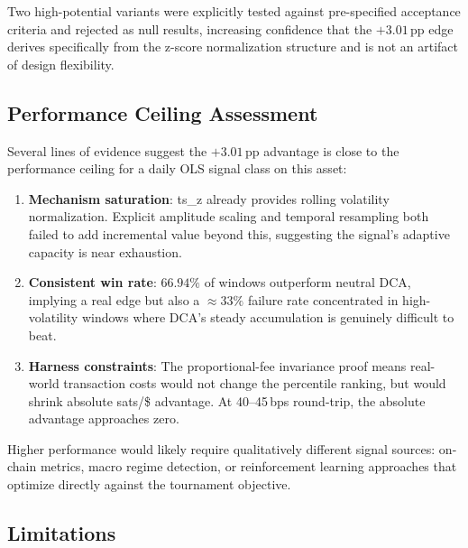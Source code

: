 \documentclass[11pt,letterpaper]{article}
\begin{document}
Two high-potential variants were explicitly tested against pre-specified
acceptance criteria and rejected as null results, increasing confidence that
the $+3.01$\,pp edge derives specifically from the z-score normalization structure
and is not an artifact of design flexibility.

\subsection{Performance Ceiling Assessment}

Several lines of evidence suggest the $+3.01$\,pp advantage is close to the
performance ceiling for a daily OLS signal class on this asset:

\begin{enumerate}
  \item \textbf{Mechanism saturation}: ts\_z already provides rolling volatility
    normalization.  Explicit amplitude scaling and temporal resampling both failed
    to add incremental value beyond this, suggesting the signal's adaptive
    capacity is near exhaustion.

  \item \textbf{Consistent win rate}: $66.94\%$ of windows outperform neutral
    DCA, implying a real edge but also a $\approx33\%$ failure rate concentrated
    in high-volatility windows where DCA's steady accumulation is genuinely
    difficult to beat.

  \item \textbf{Harness constraints}: The proportional-fee invariance proof means
    real-world transaction costs would not change the percentile ranking, but
    would shrink absolute sats/\$ advantage.  At 40--45\,bps round-trip, the
    absolute advantage approaches zero.
\end{enumerate}

Higher performance would likely require qualitatively different signal sources:
on-chain metrics, macro regime detection, or reinforcement learning approaches
that optimize directly against the tournament objective.

\subsection{Limitations}
\end{document}
